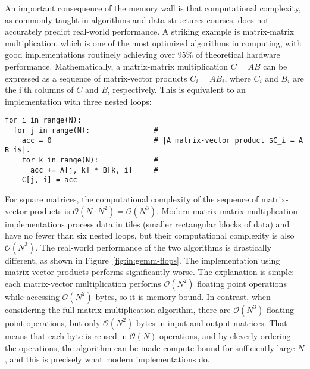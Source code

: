An important consequence of the memory wall is that computational complexity, as commonly taught in algorithms and data structures courses, does not accurately predict real-world performance. A striking example is matrix-matrix multiplication, which is one of the most optimized algorithms in computing, with good implementations routinely achieving over 95\% of theoretical hardware performance. Mathematically, a matrix-matrix multiplication $C = A B$ can be expressed as a sequence of matrix-vector products $C_i = A B_i$, where $C_i$ and $B_i$ are the i'th columns of $C$ and $B$, respectively. This is equivalent to an implementation with three nested loops:
\begin{verbatim}
for i in range(N):
  for j in range(N):               #
    acc = 0                        # |A matrix-vector product $C_i = A B_i$|.
    for k in range(N):             # 
      acc += A[j, k] * B[k, i]     #
    C[j, i] = acc
\end{verbatim}
For square matrices, the computational complexity of the sequence of matrix-vector products is $\mathcal{O}(N\cdot N^2) = \mathcal{O}(N^3)$.
Modern matrix-matrix multiplication implementations process data in tiles (smaller rectangular blocks of data) and have no fewer than six nested loops, but their computational complexity is also $\mathcal{O}(N^3)$. The real-world performance of the two algorithms is drastically different, as shown in Figure~\ref{fig:in:gemm-flops}. The implementation using matrix-vector products performs significantly worse. The explanation is simple: each matrix-vector multiplication performs $\mathcal{O}(N^2)$ floating point operations while accessing $\mathcal{O}(N^2)$ bytes, so it is memory-bound. In contrast, when considering the full matrix-multiplication algorithm, there are $\mathcal{O}(N^3)$ floating point operations, but only $\mathcal{O}(N^2)$ bytes in input and output matrices. That means that each byte is reused in $\mathcal{O}(N)$ operations, and by cleverly ordering the operations, the algorithm can be made compute-bound for sufficiently large $N$, and this is precisely what modern implementations do.

